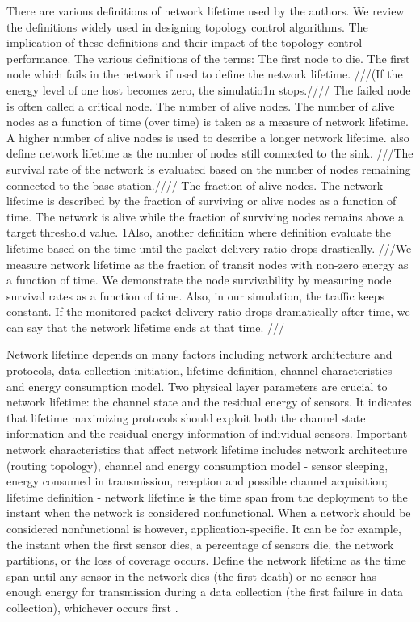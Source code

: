There are various definitions of network lifetime used by the authors. We review the definitions widely used in designing topology control algorithms. The implication of these definitions and their impact of the topology control performance. The various definitions of the terms:
The first node to die. The first node which fails in the network if used to define the network lifetime. ///(If the energy level of one host becomes zero, the simulatio1n stops.//// \cite{lifetimedef1} The failed node is often called a critical node.
The number of alive nodes. The number of alive nodes as a function of time (over time) \cite{lifetimedef2, smecn} is taken as a measure of network lifetime. A higher number of alive nodes is used to describe a longer network lifetime. \cite{smecn} also define network lifetime as the number of nodes still connected to the sink. ///The survival rate of the network is evaluated based on the number of nodes remaining connected to the base station.////
The fraction of alive nodes. The network lifetime is described by the fraction of surviving or alive nodes as a function of time. The network is alive while the fraction of surviving nodes remains above a target threshold value. 1Also, another definition where definition evaluate the lifetime based on the time until the packet delivery ratio drops drastically. ///We measure network lifetime as the fraction of transit nodes with non-zero energy as a function of time. We demonstrate the node survivability by measuring node survival rates as a function of time. Also, in our simulation, the traffic keeps constant. If the monitored packet delivery ratio drops dramatically after time, we can say that the network lifetime ends at that time. \cite{gaf}///


Network lifetime depends on many factors including network architecture and protocols, data collection initiation, lifetime definition, channel characteristics and energy consumption model. Two physical layer parameters are crucial to network lifetime: the channel state and the residual energy of sensors. It indicates that lifetime maximizing protocols should exploit both the channel state information and the residual energy information of individual sensors. Important network characteristics that affect network lifetime includes network architecture (routing topology), channel and energy consumption model - sensor sleeping, energy consumed in transmission, reception and possible channel acquisition; lifetime definition - network lifetime is the time span from the deployment to the instant when the network is considered nonfunctional. When a network should be considered nonfunctional is however, application-specific. It can be for example, the instant when the first sensor dies, a percentage of sensors die, the network partitions, or the loss of coverage occurs. Define the network lifetime as the time span until any sensor in the network dies (the first death) or no sensor has enough energy for transmission during a data collection (the first failure in data collection), whichever occurs first \cite{maxmin}.

